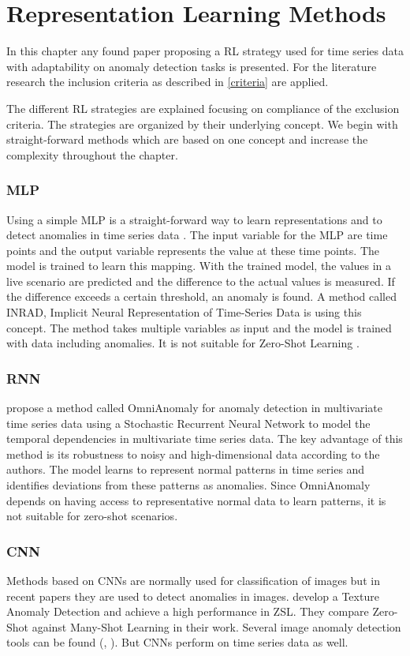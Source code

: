 \section{Representation Learning Methods}\label{review}
In this chapter any found paper proposing a RL strategy used for time series data with adaptability on anomaly detection tasks is presented. For the literature research the inclusion criteria as described in \ref{criteria} are applied.

The different RL strategies are explained focusing on compliance of the exclusion criteria. The strategies are organized by their underlying concept. We begin with straight-forward methods which are based on one concept and increase the complexity throughout the chapter.
\subsubsection{MLP}
Using a simple MLP is a straight-forward way to learn representations and to detect anomalies in time series data \cite{nielsen_neural_2015}. The input variable for the MLP are time points and the output variable represents the value at these time points. The model is trained to learn this mapping. With the trained model, the values in a live scenario are predicted and the difference to the actual values is measured. If the difference exceeds a certain threshold, an anomaly is found. A method called INRAD, Implicit Neural Representation of Time-Series Data is using this concept. The method takes multiple variables as input and the model is trained with data including anomalies. It is not suitable for Zero-Shot Learning \cite{jeong_time-series_2022}.
\subsubsection{RNN}
\cite{su_robust_2019} propose a method called OmniAnomaly for anomaly detection in multivariate time series data using a Stochastic Recurrent Neural Network to model the temporal dependencies in multivariate time series data.
The key advantage of this method is its robustness to noisy and high-dimensional data according to the authors. The model learns to represent normal patterns in time series and identifies deviations from these patterns as anomalies. Since OmniAnomaly depends on having access to representative normal data to learn patterns, it is not suitable for zero-shot scenarios.
\subsubsection{CNN}
Methods based on CNNs are normally used for classification of images but in recent papers they are used to detect anomalies in images. \cite{aota_zero-shot_2023} develop a Texture Anomaly Detection and achieve a high performance in ZSL. They compare Zero-Shot against Many-Shot Learning in their work. Several image anomaly detection tools can be found (\cite{sabokrou_deep-anomaly__2018}, \cite{aota_zero-shot_2023}). But CNNs perform on time series data as well.

